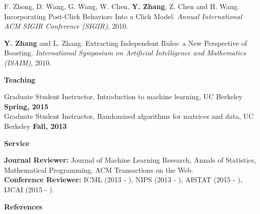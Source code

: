 \documentclass{res} %
\begin{document}
\begin{resume}
\begin{enumerate}[label={[C\arabic*]}, ref={C\arabic*}]
\item F. Zhong, D. Wang, G. Wang, W. Chen, \textbf{Y. Zhang}, Z. Chen and H. Wang. Incorporating Post-Click Behaviors Into a Click Model.
\emph{Annual International ACM SIGIR Conference (SIGIR)}, 2010. \label{incorporating-sigir10}

\item \textbf{Y. Zhang} and L. Zhang. Extracting Independent Rules: a New Perspective of Boosting. 
\emph{International Symposium on Artificial Intelligence and Mathematics (ISAIM)}, 2010. \label{a-new-isaim10}
\end{enumerate}

{\Large\bf Teaching}

\vspace{-5pt}
Graduate Student Instructor, Introduction to machine learning, UC Berkeley \hfill\textbf{Spring, 2015}\\
Graduate Student Instructor, Randomized algorithms for matrices and data, UC Berkeley \hfill\textbf{Fall, 2013}

{\Large\bf Service}

\vspace{-5pt}
{\bf Journal Reviewer:} Journal of Machine Learning Research, Annals of Statistics, Mathematical Programming, ACM Transactions on the Web. \\
{\bf Conference Reviewer:} ICML (2013 - ), NIPS (2013 - ), AISTAT (2015 - ), IJCAI (2015 - ).

{\Large\bf References}


\end{resume}
\end{document}
